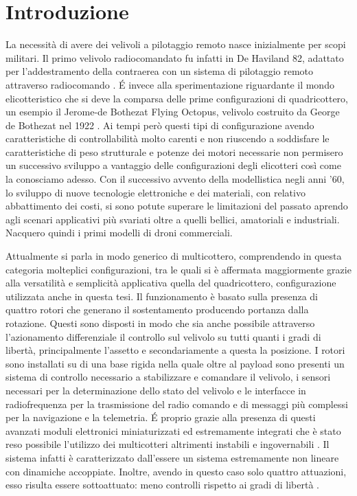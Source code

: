 \chapter{Introduzione}
La necessità di avere dei velivoli a pilotaggio remoto nasce inizialmente per scopi militari. Il primo velivolo radiocomandato fu infatti in De Haviland 82, adattato per l'addestramento della contraerea con un sistema di pilotaggio remoto attraverso radiocomando \cite{histoDrone}. \'E invece alla sperimentazione riguardante il mondo elicotteristico che si deve la comparsa delle prime configurazioni di quadricottero, un esempio il Jerome-de Bothezat Flying Octopus, velivolo costruito da George de Bothezat nel 1922 \cite{Young}. Ai tempi però questi tipi di configurazione avendo caratteristiche di controllabilità molto carenti e non riuscendo a soddisfare le caratteristiche di peso strutturale e potenze dei motori necessarie non permisero un successivo sviluppo a vantaggio delle configurazioni degli elicotteri così come la conosciamo adesso. Con il successivo avvento della modellistica negli anni '60, lo sviluppo di nuove tecnologie elettroniche e dei materiali, con relativo abbattimento dei costi, si sono potute superare le limitazioni del passato aprendo agli scenari applicativi più svariati oltre a quelli bellici, amatoriali e industriali. Nacquero quindi i primi modelli di droni commerciali.

Attualmente si parla in modo generico di multicottero, comprendendo in questa categoria molteplici configurazioni, tra le quali si è affermata maggiormente grazie alla versatilità e semplicità applicativa quella del quadricottero, configurazione utilizzata anche in questa tesi. Il funzionamento è basato sulla presenza di quattro rotori che generano il sostentamento producendo portanza dalla rotazione. Questi sono disposti in modo che sia anche possibile attraverso l'azionamento differenziale il controllo sul velivolo su tutti quanti i gradi di libertà, principalmente l'assetto e secondariamente a questa la posizione. I rotori sono installati su di una base rigida nella quale oltre al payload sono presenti un sistema di controllo necessario a stabilizzare e comandare il velivolo, i sensori necessari per la determinazione dello stato del velivolo e le interfacce in radiofrequenza per la trasmissione del radio comando e di messaggi più complessi per la navigazione e la telemetria. \'E proprio grazie alla presenza di questi avanzati moduli elettronici miniaturizzati ed estremamente integrati che è stato reso possibile l'utilizzo dei multicotteri altrimenti instabili e ingovernabili \cite{multi2015}. Il sistema infatti è caratterizzato dall'essere un sistema estremamente non lineare con dinamiche accoppiate. Inoltre, avendo in questo caso solo quattro attuazioni, esso risulta essere sottoattuato: meno controlli rispetto ai gradi di libertà \cite{nonlinear2008}.

